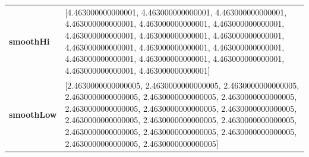 		\begin{table}[H]
			\centering
			\begin{tabularx}{\textwidth}{lX}
		\textbf{smoothHi} & [4.463000000000001, 4.463000000000001, 4.463000000000001, 4.463000000000001, 4.463000000000001, 4.463000000000001, 4.463000000000001, 4.463000000000001, 4.463000000000001, 4.463000000000001, 4.463000000000001, 4.463000000000001, 4.463000000000001, 4.463000000000001, 4.463000000000001, 4.463000000000001, 4.463000000000001] 
		\\
		\textbf{smoothLow} &[2.4630000000000005, 2.4630000000000005, 2.4630000000000005, 2.4630000000000005, 2.4630000000000005, 2.4630000000000005, 2.4630000000000005, 2.4630000000000005, 2.4630000000000005, 2.4630000000000005, 2.4630000000000005, 2.4630000000000005, 2.4630000000000005, 2.4630000000000005, 2.4630000000000005, 2.4630000000000005, 2.4630000000000005]
		\\ 
	\end{tabularx} 
\end{table}
